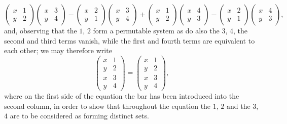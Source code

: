 \documentclass[11pt,a4paper]{book}
\begin{document}
\[\begin{pmatrix} x & 1 \\ y & 2 \end{pmatrix} \begin{pmatrix} x & 3 \\ y & 4 \end{pmatrix} - \begin{pmatrix} x & 2 \\ y & 1 \end{pmatrix} \begin{pmatrix} x & 3 \\ y & 4 \end{pmatrix} + \begin{pmatrix} x & 1 \\ y & 2 \end{pmatrix} \begin{pmatrix} x & 4 \\ y & 3 \end{pmatrix} - \begin{pmatrix} x & 2 \\ y & 1 \end{pmatrix} \begin{pmatrix} x & 4 \\ y & 3 \end{pmatrix},\]
and, observing that the $1$, $2$ form a permutable system as do also the $3$, $4$, the second and third terms vanish, while the first and fourth terms are equivalent to each other; we may therefore write
\[\begin{pmatrix} x & 1 \\ y & 2 \\ \hline x & 3 \\ y & 4 \end{pmatrix} = \begin{pmatrix} x & 1 \\ y & 2 \\ \hline x & 3 \\ y & 4 \end{pmatrix},\]
where on the first side of the equation the bar has been introduced into the second column, in order to show that throughout the equation the $1$, $2$ and the $3$, $4$ are to be considered as forming distinct sets.
\end{document}
